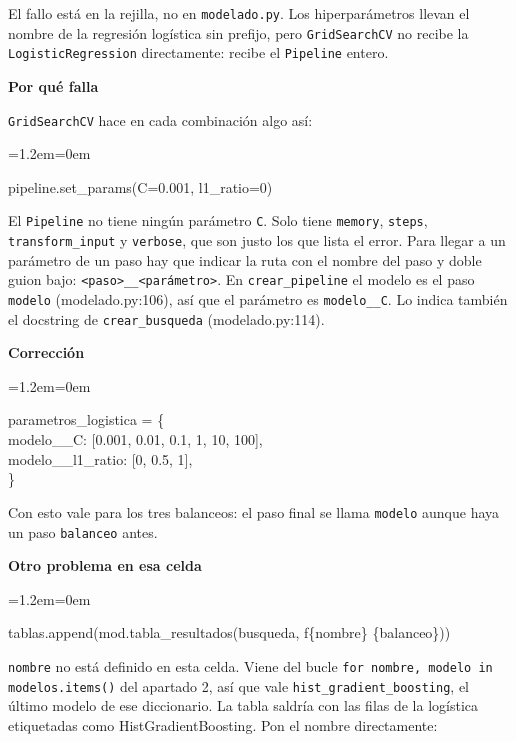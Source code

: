 \documentclass[11pt,a4paper]{article}
\newenvironment{codigo}
  {\par\smallskip\begin{list}{}{\leftmargin=1.2em\rightmargin=0em}\item\relax\ttfamily\scriptsize\raggedright}
  {\end{list}\smallskip}
\begin{document}
{\small
El fallo está en la rejilla, no en \texttt{modelado.py}. Los hiperparámetros llevan el nombre de la regresión logística sin prefijo, pero \texttt{GridSearchCV} no recibe la \texttt{LogisticRegression} directamente: recibe el \texttt{Pipeline} entero.

\smallskip\noindent\textbf{Por qué falla}\par
\texttt{GridSearchCV} hace en cada combinación algo así:

\begin{codigo}
pipeline.set\_\allowbreak{}params(C=0.001, l1\_\allowbreak{}ratio=0)
\end{codigo}
El \texttt{Pipeline} no tiene ningún parámetro \texttt{C}. Solo tiene \texttt{memory}, \texttt{steps}, \texttt{transform\_\allowbreak{}input} y \texttt{verbose}, que son justo los que lista el error. Para llegar a un parámetro de un paso hay que indicar la ruta con el nombre del paso y doble guion bajo: \texttt{\textless{}paso\textgreater{}\_\allowbreak{}\_\allowbreak{}\textless{}parámetro\textgreater{}}. En \texttt{crear\_\allowbreak{}pipeline} el modelo es el paso \texttt{\textquotedbl{}modelo\textquotedbl{}} (modelado.py:106), así que el parámetro es \texttt{modelo\_\allowbreak{}\_\allowbreak{}C}. Lo indica también el docstring de \texttt{crear\_\allowbreak{}busqueda} (modelado.py:114).

\smallskip\noindent\textbf{Corrección}\par
\begin{codigo}
parametros\_\allowbreak{}logistica = \{ \\{}
\hspace*{2.08em}\textquotedbl{}modelo\_\allowbreak{}\_\allowbreak{}C\textquotedbl{}: [0.001, 0.01, 0.1, 1, 10, 100], \\{}
\hspace*{2.08em}\textquotedbl{}modelo\_\allowbreak{}\_\allowbreak{}l1\_\allowbreak{}ratio\textquotedbl{}: [0, 0.5, 1], \\{}
\}
\end{codigo}
Con esto vale para los tres balanceos: el paso final se llama \texttt{\textquotedbl{}modelo\textquotedbl{}} aunque haya un paso \texttt{\textquotedbl{}balanceo\textquotedbl{}} antes.

\smallskip\noindent\textbf{Otro problema en esa celda}\par
\begin{codigo}
tablas.append(mod.tabla\_\allowbreak{}resultados(busqueda, f\textquotedbl{}\{nombre\} \textbar{} \{balanceo\}\textquotedbl{}))
\end{codigo}
\texttt{nombre} no está definido en esta celda. Viene del bucle \texttt{for nombre, modelo in modelos.items()} del apartado 2, así que vale \texttt{\textquotedbl{}hist\_\allowbreak{}gradient\_\allowbreak{}boosting\textquotedbl{}}, el último modelo de ese diccionario. La tabla saldría con las filas de la logística etiquetadas como HistGradientBoosting. Pon el nombre directamente:

}
\end{document}
